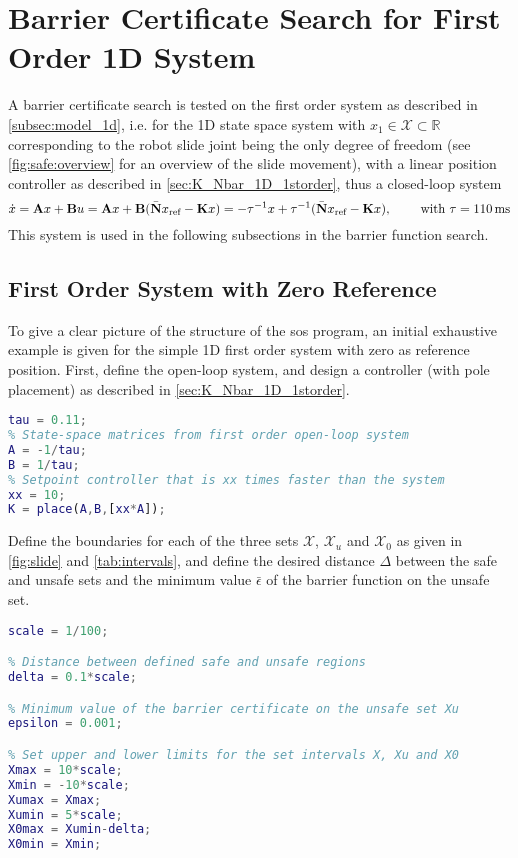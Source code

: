 
\section{Barrier Certificate Search for First Order 1D System}
A barrier certificate search is tested on the first order system as described in \autoref{subsec:model_1d}, i.e. for the  1D state space system with $x_1\in\mathcal{X}\subset\mathbb{R}$ corresponding to the robot slide joint being the only degree of freedom (see \autoref{fig:safe:overview} for an overview of the slide movement), with a linear position controller as described in \autoref{sec:K_Nbar_1D_1storder}, thus a closed-loop system
\begin{equation}
\dot{x} = \textbf{A}x+\textbf{B}u = \textbf{A}x+\textbf{B}(\bar{\mathbf{N}}x_\text{ref}-\textbf{K}x) = %
-\tau^{-1}x+\tau^{-1}(\bar{\mathbf{N}}x_\text{ref}-\textbf{K}x), \kk \text{with }\tau=110\,\text{ms}\label{eq:sos_firstorder}
\end{equation}
This system is used in the following subsections in the barrier function search.

\subsection{First Order System with Zero Reference}\label{subsec:zeroref}
To give a clear picture of the structure of the \gls{sos} program, an initial exhaustive example is given for the simple 1D first order system with zero as reference position.
First, define the open-loop system, and design a controller (with pole placement) as described in \autoref{sec:K_Nbar_1D_1storder}.
\begin{lstlisting}[language=matlab]
% Time constant from measurement
tau = 0.11;
% State-space matrices from first order open-loop system
A = -1/tau;
B = 1/tau;
% Setpoint controller that is xx times faster than the system
xx = 10;
K = place(A,B,[xx*A]);
\end{lstlisting}
Define the boundaries for each of the three sets $\mathcal{X}$, $\mathcal{X}_u$ and $\mathcal{X}_0$ as given in \autoref{fig:slide} and \autoref{tab:intervals}, and define the desired distance $\Delta$ between the safe and unsafe sets and  the minimum value $\bar{\epsilon}$ of the barrier function on the unsafe set. %
\begin{lstlisting}[language=matlab]
% scaling factor = 1/100 for [meter], or 1 for [cm]
scale = 1/100;

% Distance between defined safe and unsafe regions
delta = 0.1*scale;

% Minimum value of the barrier certificate on the unsafe set Xu
epsilon = 0.001;

% Set upper and lower limits for the set intervals X, Xu and X0
Xmax = 10*scale;
Xmin = -10*scale;
Xumax = Xmax;
Xumin = 5*scale;
X0max = Xumin-delta;
X0min = Xmin;
\end{lstlisting}

